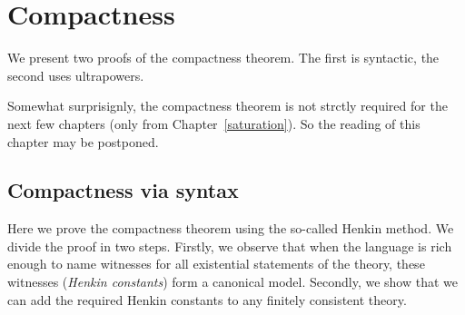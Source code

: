 \documentclass[creche.tex]{subfiles}
\begin{document}
\chapter{Compactness}
\label{compactness}

\def\medrel#1{\parbox[t]{6ex}{$\displaystyle\hfil #1$}}
\def\ceq#1#2#3{\parbox{25ex}{$\displaystyle #1$}\medrel{#2}$\displaystyle  #3$}

We present two proofs of the compactness theorem. The first is syntactic, the second uses ultrapowers.

Somewhat surprisignly, the compactness theorem is not strctly required for the next few chapters (only from Chapter~\ref{saturation}). So the reading of this chapter may be postponed.

\section{Compactness via syntax}

Here we prove the compactness theorem using the so-called Henkin method. We divide the proof in two steps. Firstly, we observe that when the language is rich enough to name witnesses for all existential statements of the theory, these witnesses (\textit{Henkin constants\/}) form a canonical model. Secondly, we show that we can add the required Henkin constants to any finitely consistent theory.
\end{document}
